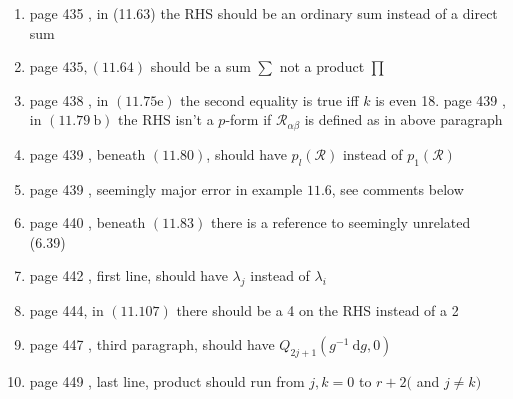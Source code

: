 \documentclass{article}
\begin{document}
\begin{enumerate}
\item page 435 , in (11.63) the RHS should be an ordinary sum instead of a direct sum

\item page $435,(11.64)$ should be a sum $\sum$ not a product $\prod$

\item page 438 , in $(11.75 \mathrm{e})$ the second equality is true iff $k$ is even 18. page 439 , in $(11.79 \mathrm{~b})$ the $\mathrm{RHS}$ isn't a $p$-form if $\mathcal{R}_{\alpha \beta}$ is defined as in above paragraph

\item page 439 , beneath $(11.80)$, should have $p_{l}(\mathcal{R})$ instead of $p_{1}(\mathcal{R})$

\item page 439 , seemingly major error in example $11.6$, see comments below

\item page 440 , beneath $(11.83)$ there is a reference to seemingly unrelated (6.39)

\item page 442 , first line, should have $\lambda_{j}$ instead of $\lambda_{i}$

\item page 444, in $(11.107)$ there should be a 4 on the RHS instead of a 2

\item page 447 , third paragraph, should have $Q_{2 j+1}\left(g^{-1} \mathrm{~d} g, 0\right)$

\item page 449 , last line, product should run from $j, k=0$ to $r+2($ and $j \neq k)$
\end{enumerate}
\end{document}
